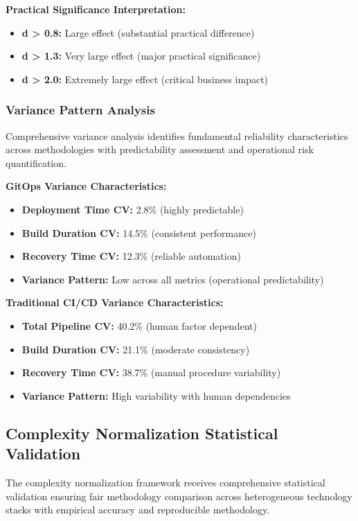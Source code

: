 \textbf{Practical Significance Interpretation:}
\begin{itemize}
\item \textbf{d > 0.8:} Large effect (substantial practical difference)
\item \textbf{d > 1.3:} Very large effect (major practical significance)
\item \textbf{d > 2.0:} Extremely large effect (critical business impact)
\end{itemize}

\subsubsection{Variance Pattern Analysis}

Comprehensive variance analysis identifies fundamental reliability characteristics across methodologies with predictability assessment and operational risk quantification.

\textbf{GitOps Variance Characteristics:}
\begin{itemize}
\item \textbf{Deployment Time CV:} 2.8\% (highly predictable)
\item \textbf{Build Duration CV:} 14.5\% (consistent performance)
\item \textbf{Recovery Time CV:} 12.3\% (reliable automation)
\item \textbf{Variance Pattern:} Low across all metrics (operational predictability)
\end{itemize}

\textbf{Traditional CI/CD Variance Characteristics:}
\begin{itemize}
\item \textbf{Total Pipeline CV:} 40.2\% (human factor dependent)
\item \textbf{Build Duration CV:} 21.1\% (moderate consistency)
\item \textbf{Recovery Time CV:} 38.7\% (manual procedure variability)
\item \textbf{Variance Pattern:} High variability with human dependencies
\end{itemize}

\subsection{Complexity Normalization Statistical Validation}
\label{subsec:complexity_normalization_validation}

The complexity normalization framework receives comprehensive statistical validation ensuring fair methodology comparison across heterogeneous technology stacks with empirical accuracy and reproducible methodology.

